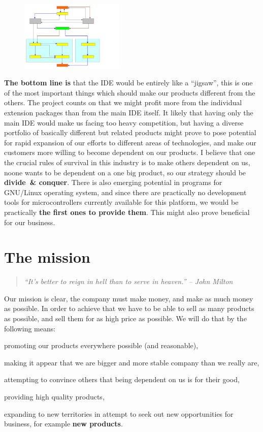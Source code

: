 \documentclass[a4paper,twoside,15pt]{book}
\begin{document}
		\pagebreak

		\begin{figure}
			\centering{}
			\includegraphics[width=140pt]{images/a_diagram.png}
		\end{figure}

		\textbf{The bottom line is} that the IDE would be entirely like a ``jigsaw'', this is one of the most important things which should make our products different from the others. The project counts on that we might profit more from the individual extension packages than from the main IDE itself. It likely that having only the main IDE would make us facing too heavy competition, but having a diverse portfolio of basically different but related products might prove to pose potential for rapid expansion of our efforts to different areas of technologies, and make our customers more willing to become dependent on our products. I believe that one the crucial rules of survival in this industry is to make others dependent on us, noone wants to be dependent on a one big product, so our strategy should be \textbf{divide~\& conquer}. There is also emerging potential in programs for GNU/Linux operating system, and since there are practically no development tools for microcontrollers currently available for this platform, we would be practically \textbf{the first ones to provide them}. This might also prove beneficial for our business.

	\section{The mission}
		\begin{quote}
			\textit{``It's better to reign in hell than to serve in heaven.'' -- John Milton}
		\end{quote}

		Our mission is clear, the company must make money, and make as much money as possible. In order to achieve that we have to be able to sell as many products as possible, and sell them for as high price as possible. We will do that by the following means:
		\begin{dinglist}{73}
			\item promoting our products everywhere possible (and reasonable),
			\item making it appear that we are bigger and more stable company than we really are,
			\item attempting to convince others that being dependent on us is for their good,
			\item providing high quality products,
			\item expanding to new territories in attempt to seek out new opportunities for business, for example \textbf{new products}.
		\end{dinglist}
\end{document}
